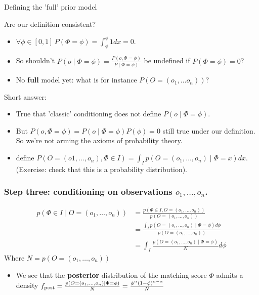 \documentclass{beamer}
\begin{document}
\begin{frame}{Defining the 'full' prior model}
  \begin{alertblock}{Are our definition consistent?}
    \begin{itemize}
    \item $\forall \phi \in [0,1]\, P(\Phi = \phi) = \int_\phi^\phi 1 dx = 0$.
    \item So shouldn't $P(o \mid \Phi = \phi) = \frac{P(o, \Phi=\phi)}{P(\Phi=\phi)}$ be undefined if $P(\Phi = \phi)=0$?
    \item No {\bf full} model yet: what is for instance $P(O = (o_1,\dots o_n))$?
    \end{itemize}
  \end{alertblock}

  \begin{block}{Short answer:}
    \begin{itemize}
    \item True that 'classic' conditioning does not define $P(o \mid \Phi = \phi)$.  
    \item But $P(o, \Phi = \phi) = P(o \mid \Phi = \phi)P(\phi) = 0$ still true under our definition. So we're not arming the axioms of probability theory.
    \item define $P(O = (o1, \dots, o_n), \Phi \in I) = \int_I p(O = (o_1, \dots, o_n) \mid \Phi = x) dx$. (Exercise: check that this is a probability distribution).
    \end{itemize}
  \end{block}
\end{frame}

\begin{frame}
  \frametitle{Step three: conditioning on observations $o_1, \dots, o_n$.}
  
  \[\begin{aligned}
  p(\Phi \in I \mid O=(o_1, \dots, o_n)) &= \frac{p(\Phi \in I, O=(o_1, \dots, o_n))}{p(O=(o_1, \dots, o_n))}\\
  &= \frac{\int_I p(O = (o_1, \dots, o_n) \mid \Phi = \phi) d\phi}{p(O=(o_1, \dots, o_n))}\\
  &= \int_I \frac{p(O = (o_1, \dots, o_n) \mid \Phi = \phi)}{N} d\phi 
    \end{aligned}\]
  Where $N = p(O=(o_1, \dots, o_n))$ %

  \begin{itemize}
  \item We see that the {\bf posterior} distribution of the matching score $\Phi$ admits a density $f_{\textnormal{post}} = \frac{p(O = (o_1, \dots, o_n) \mid \Phi = \phi)}{N} = \frac{\phi^{\alpha}(1-\phi)^{n-\alpha}}{N}$
  \end{itemize}
  \end{frame}

  
\end{document}
